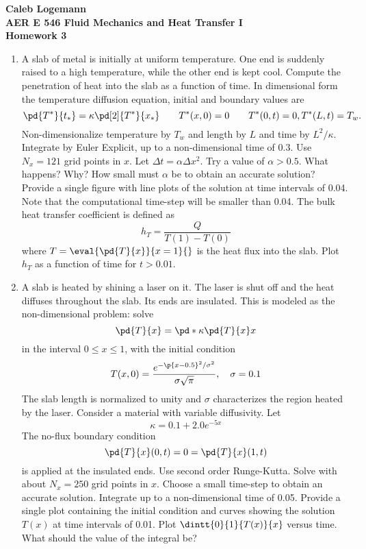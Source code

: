 \documentclass[11pt, oneside]{article}
\begin{document}
\noindent \textbf{\Large{Caleb Logemann \\
AER E 546 Fluid Mechanics and Heat Transfer I \\
Homework 3
}}

%
\begin{enumerate}
  \item %
    A slab of metal is initially at uniform temperature.
    One end is suddenly raised to a high temperature, while the other end is kept cool.
    Compute the penetration of heat into the slab as a function of time.
    In dimensional form the temperature diffusion equation, initial and boundary values are
    \[
      \pd{T^*}{t_*} = \kappa \pd[2]{T^*}{x_*} \qquad T^*(x,0) = 0 \qquad T^*(0, t) = 0, T^*(L, t) = T_w.
    \]
    Non-dimensionalize temperature by $T_w$ and length by $L$ and time by $L^2/\kappa$.
    Integrate by Euler Explicit, up to a non-dimensional time of $0.3$.
    Use $N_x = 121$ grid points in $x$.
    Let $\Delta t = \alpha \Delta x^2$.
    Try a value of $\alpha > 0.5$.
    What happens?
    Why?
    How small must $\alpha$ be to obtain an accurate solution?
    Provide a single figure with line plots of the solution at time intervals of 0.04.
    Note that the computational time-step will be smaller than 0.04.
    The bulk heat transfer coefficient is defined as
    \[
      h_T = \frac{Q}{T(1) - T(0)}
    \]
    where $T = \eval{\pd{T}{x}}{x = 1}{}$ is the heat flux into the slab.
    Plot $h_T$ as a function of time for $t > 0.01$.

  \item %
    A slab is heated by shining a laser on it.
    The laser is shut off and the heat diffuses throughout the slab.
    Its ends are insulated.
    This is modeled as the non-dimensional problem: solve
    \[
      \pd{T}{x} = \pd*{\kappa \pd{T}{x}}{x}
    \]
    in the interval $0 \le x \le 1$, with the initial condition
    \[
      T(x, 0) = \frac{e^{-\p{x - 0.5}^2/\sigma^2}}{\sigma \sqrt{\pi}}, \quad \sigma = 0.1
    \]
    The slab length is normalized to unity and $\sigma$ characterizes the
    region heated by the laser.
    Consider a material with variable diffusivity.
    Let
    \[
      \kappa = 0.1 + 2.0 e^{-5x}
    \]
    The no-flux boundary condition
    \[
      \pd{T}{x}(0, t) = 0 = \pd{T}{x}(1, t)
    \]
    is applied at the insulated ends.
    Use second order Runge-Kutta.
    Solve with about $N_x = 250$ grid points in $x$.
    Choose a small time-step to obtain an accurate solution.
    Integrate up to a non-dimensional time of 0.05.
    Provide a single plot containing the initial condition and curves showing
    the solution $T(x)$ at time intervals of 0.01.
    Plot $\dintt{0}{1}{T(x)}{x}$ versus time.
    What should the value of the integral be?


\end{enumerate}
\end{document}
